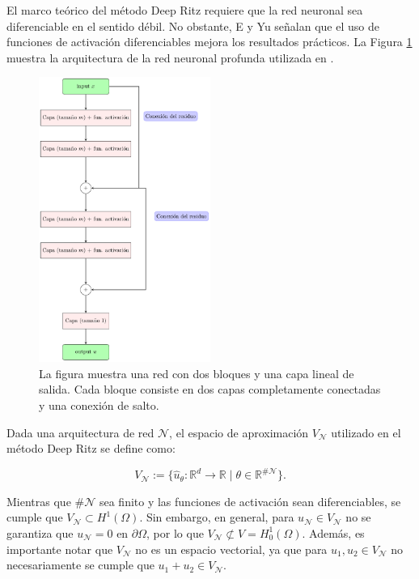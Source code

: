 \documentclass[a4paper,11pt,spanish, twoside, leqno]{tfg-uam}
\theoremstyle{definition}
\begin{document}
El marco teórico del método Deep Ritz requiere que la red neuronal sea diferenciable en el sentido débil. No obstante, E y Yu señalan que el uso de funciones de activación diferenciables mejora los resultados prácticos. La Figura \ref{fig:net_structure_1} muestra la arquitectura de la red neuronal profunda utilizada en \cite{e2017deepritzmethoddeep}.

\begin{figure}[h!]
    \centering
    \vspace{2pt}
    \includegraphics[width=0.5\textwidth]{TEX_Figures/deep_ritz_nn.pdf}
    \caption{La figura muestra una red con dos bloques y una capa lineal de salida.
    Cada bloque consiste en dos capas completamente conectadas y una conexión de salto.}
    \label{fig:net_structure_1}
\end{figure}
Dada una arquitectura de red $ \mathcal{N} $, el espacio de aproximación $ V_{\mathcal{N}} $ utilizado en el método Deep Ritz se define como:

\begin{equation*}
V_{\mathcal{N}} := \{ \hat{u}_\theta: \mathbb{R}^d \to \mathbb{R} \mid \theta \in \mathbb{R}^{\#\mathcal{N}} \}.
\end{equation*}

Mientras que $ \#\mathcal{N} $ sea finito y las funciones de activación sean diferenciables, se cumple que $ V_{\mathcal{N}} \subset H^1(\Omega) $. Sin embargo, en general, para $ u_{\mathcal{N}} \in V_{\mathcal{N}} $ no se garantiza que $ u_{\mathcal{N}} = 0 $ en $ \partial \Omega $, por lo que $ V_{\mathcal{N}} \not\subset V = H^1_0(\Omega) $. Además, es importante notar que $ V_{\mathcal{N}} $ no es un espacio vectorial, ya que para $ u_1, u_2 \in V_{\mathcal{N}} $ no necesariamente se cumple que $ u_1 + u_2 \in V_{\mathcal{N}} $.
\end{document}
